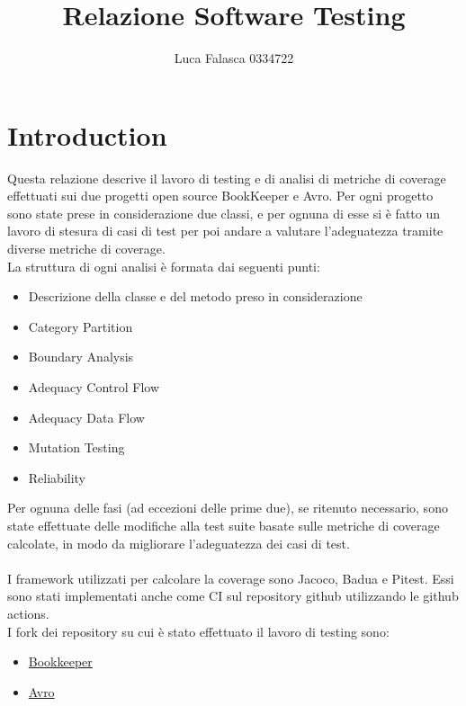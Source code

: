 \documentclass[10pt, a4paper]{article}
\title{Relazione Software Testing}
\author{Luca Falasca 0334722}
\begin{document}
\date{}
\maketitle


\thispagestyle{empty}
\tableofcontents
\listoftables
\listoffigures


\thispagestyle{empty}
\newpage
\setcounter{page}{1}
\section{Introduction}
Questa relazione descrive il lavoro di testing e di analisi di metriche di coverage
 effettuati sui due progetti open source BookKeeper e Avro.
Per ogni progetto sono state prese in considerazione due classi, e per ognuna di esse
si è fatto un lavoro di stesura di casi di test per poi andare a valutare l'adeguatezza
tramite diverse metriche di coverage. \\
La struttura di ogni analisi è formata dai seguenti punti: 
\begin{itemize}
  \item Descrizione della classe e del metodo preso in considerazione
  \item Category Partition
  \item Boundary Analysis
  \item Adequacy Control Flow
  \item Adequacy Data Flow
  \item Mutation Testing
  \item Reliability
\end{itemize}
Per ognuna delle fasi (ad eccezioni delle prime due), se ritenuto necessario, sono state effettuate delle modifiche
alla test suite basate sulle metriche di coverage calcolate, in modo da migliorare l'adeguatezza dei casi di test.\\ \\
I framework utilizzati per calcolare la coverage sono Jacoco, Badua e Pitest. Essi sono stati
implementati anche come CI sul repository github utilizzando le github actions. \\ 
I fork dei repository su cui è stato effettuato il lavoro di testing sono:
\begin{itemize}
  \item \href{https://github.com/LucaFalasca/bookkeeper}{Bookkeeper}
  \item \href{https://github.com/LucaFalasca/avro}{Avro}
\end{itemize} 
\end{document}
